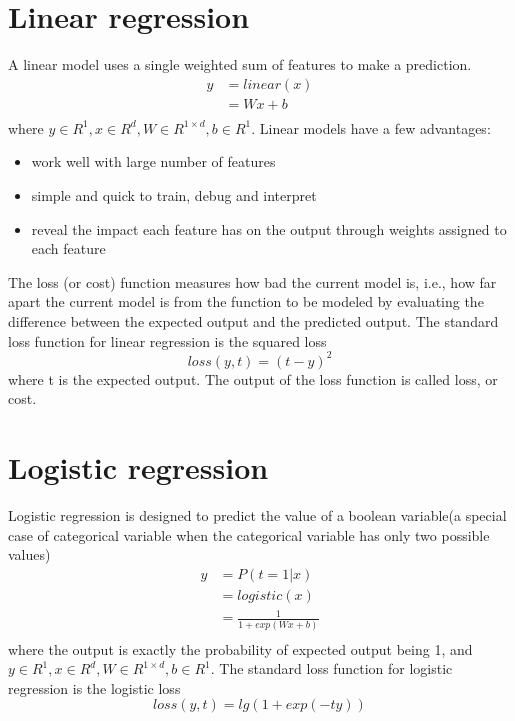 \documentclass[12pt]{WSUThesis}
\theoremstyle{definition}
\begin{document}
\section{Linear regression}
A linear model uses a single weighted sum of features to make a prediction.
\begin{align*}
	y
	&= linear(x) \\
	&= Wx + b \\
\end{align*}
where $ y \in R^1, x \in R^d, W \in R^{1 \times d}, b \in R^1 $.
Linear models have a few advantages:
\begin{itemize}
	\item work well with large number of features
	\item simple and quick to train, debug and interpret
	\item reveal the impact each feature has on the output through weights assigned to each feature
\end{itemize}
The loss (or cost) function measures how bad the current model is, i.e., how far apart the current model is from the function to be modeled by evaluating the difference between the expected output and the predicted output.
The standard loss function for linear regression is the squared loss
\[loss(y, t) = (t - y)^2 \]
where t is the expected output.
The output of the loss function is called loss, or cost.

\section{Logistic regression}
Logistic regression is designed to predict the value of a boolean variable(a special case of categorical variable when the categorical variable has only two possible values)
\begin{align*}
	y
	&= P(t = 1 | x) \\
	&= logistic(x) \\
	&= \frac{1}{1 + exp(Wx+b)}\\
\end{align*}
where the output is exactly the probability of expected output being 1, and $ y \in R^1, x \in R^d, W \in R^{1 \times d}, b \in R^1 $.
The standard loss function for logistic regression is the logistic loss
\[ loss(y, t) = lg(1 + exp(-ty)) \]
\end{document}
